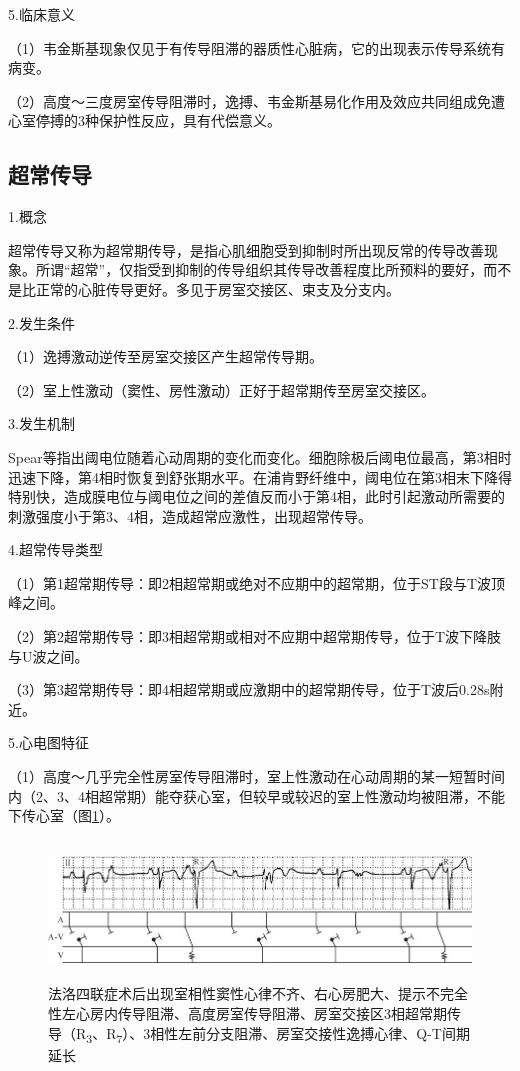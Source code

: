 5.临床意义

（1）韦金斯基现象仅见于有传导阻滞的器质性心脏病，它的出现表示传导系统有病变。

（2）高度～三度房室传导阻滞时，逸搏、韦金斯基易化作用及效应共同组成免遭心室停搏的3种保护性反应，具有代偿意义。

\protect\hypertarget{text00035.htmlux5cux23subid416}{}{}

\subsection{超常传导}

1.概念

超常传导又称为超常期传导，是指心肌细胞受到抑制时所出现反常的传导改善现象。所谓“超常”，仅指受到抑制的传导组织其传导改善程度比所预料的要好，而不是比正常的心脏传导更好。多见于房室交接区、束支及分支内。

2.发生条件

（1）逸搏激动逆传至房室交接区产生超常传导期。

（2）室上性激动（窦性、房性激动）正好于超常期传至房室交接区。

3.发生机制

Spear等指出阈电位随着心动周期的变化而变化。细胞除极后阈电位最高，第3相时迅速下降，第4相时恢复到舒张期水平。在浦肯野纤维中，阈电位在第3相末下降得特别快，造成膜电位与阈电位之间的差值反而小于第4相，此时引起激动所需要的刺激强度小于第3、4相，造成超常应激性，出现超常传导。

4.超常传导类型

（1）第1超常期传导：即2相超常期或绝对不应期中的超常期，位于ST段与T波顶峰之间。

（2）第2超常期传导：即3相超常期或相对不应期中超常期传导，位于T波下降肢与U波之间。

（3）第3超常期传导：即4相超常期或应激期中的超常期传导，位于T波后0.28s附近。

5.心电图特征

（1）高度～几乎完全性房室传导阻滞时，室上性激动在心动周期的某一短暂时间内（2、3、4相超常期）能夺获心室，但较早或较迟的室上性激动均被阻滞，不能下传心室（图\ref{fig28-5}）。

\begin{figure}[!htbp]
 \centering
 \includegraphics[width=5.78125in,height=1.45833in]{./images/Image00465.jpg}
 \captionsetup{justification=centering}
 \caption{法洛四联症术后出现室相性窦性心律不齐、右心房肥大、提示不完全性左心房内传导阻滞、高度房室传导阻滞、房室交接区3相超常期传导（R\textsubscript{3}、R\textsubscript{7}）、3相性左前分支阻滞、房室交接性逸搏心律、Q-T间期延长}
 \label{fig28-5}
  \end{figure} 


